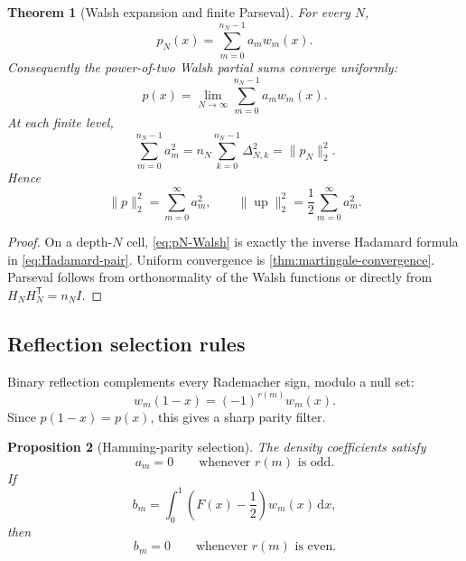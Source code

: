 \documentclass[11pt,oneside]{article}
\newtheorem{theorem}{Theorem}[section]
\newtheorem{proposition}[theorem]{Proposition}
\theoremstyle{definition}
\theoremstyle{remark}
\newcommand{\Up}{\operatorname{up}}
\newcommand{\dd}{\,\mathrm d}
\begin{document}
\begin{theorem}[Walsh expansion and finite Parseval]
\label{thm:Walsh-expansion}
For every $N$,
\begin{equation}\label{eq:pN-Walsh}
 p_N(x)=\sum_{m=0}^{n_N-1}a_mw_m(x).
\end{equation}
Consequently the power-of-two Walsh partial sums converge uniformly:
\begin{equation}\label{eq:p-Walsh}
 p(x)=\lim_{N\to\infty}\sum_{m=0}^{n_N-1}a_mw_m(x).
\end{equation}
At each finite level,
\begin{equation}\label{eq:Walsh-Parseval-finite}
 \sum_{m=0}^{n_N-1}a_m^2
 =n_N\sum_{k=0}^{n_N-1}\Delta_{N,k}^2
 =\|p_N\|_2^2.
\end{equation}
Hence
\begin{equation}\label{eq:Walsh-Parseval-limit}
 \|p\|_2^2=\sum_{m=0}^\infty a_m^2,
 \qquad
 \|\Up\|_2^2=\frac12\sum_{m=0}^\infty a_m^2.
\end{equation}
\end{theorem}

\begin{proof}
On a depth-$N$ cell, \eqref{eq:pN-Walsh} is exactly the inverse Hadamard
formula in \eqref{eq:Hadamard-pair}.  Uniform convergence is
\cref{thm:martingale-convergence}.  Parseval follows from orthonormality of the
Walsh functions or directly from $H_NH_N^{\mathsf T}=n_NI$.
\end{proof}

\subsection{Reflection selection rules}

Binary reflection complements every Rademacher sign, modulo a null set:
\begin{equation}\label{eq:Walsh-reflection}
 w_m(1-x)=(-1)^{r(m)}w_m(x).
\end{equation}
Since $p(1-x)=p(x)$, this gives a sharp parity filter.

\begin{proposition}[Hamming-parity selection]
\label{prop:Walsh-selection}
The density coefficients satisfy
\begin{equation}\label{eq:a-odd-vanish}
 a_m=0\qquad\text{whenever }r(m)\text{ is odd}.
\end{equation}
If
\begin{equation}\label{eq:b_m-F}
 b_m=\int_0^1\left(F(x)-\frac12\right)w_m(x)\dd x,
\end{equation}
then
\begin{equation}\label{eq:b-even-vanish}
 b_m=0\qquad\text{whenever }r(m)\text{ is even}.
\end{equation}
\end{proposition}
\end{document}
